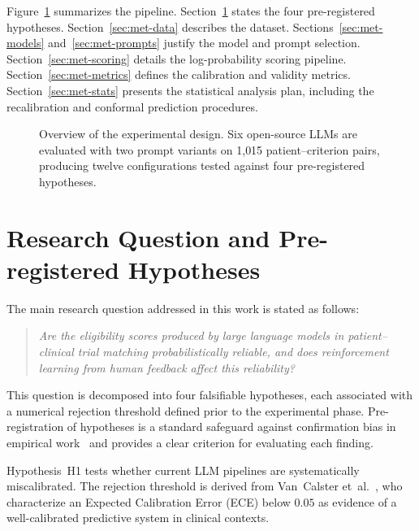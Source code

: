 Figure~\ref{fig:met-overview} summarizes the pipeline. Section~\ref{sec:met-hypotheses} 
states the four pre-registered hypotheses. Section~\ref{sec:met-data} describes 
the dataset. Sections~\ref{sec:met-models} and~\ref{sec:met-prompts} justify 
the model and prompt selection. Section~\ref{sec:met-scoring} details the 
log-probability scoring pipeline. Section~\ref{sec:met-metrics} defines the 
calibration and validity metrics. Section~\ref{sec:met-stats} presents the 
statistical analysis plan, including the recalibration and conformal 
prediction procedures.

\begin{figure}[htbp]
    \centering
    \caption{Overview of the experimental design. Six open-source LLMs are 
        evaluated with two prompt variants on 1{,}015 patient--criterion pairs, 
        producing twelve configurations tested against four pre-registered 
        hypotheses.}
    \label{fig:met-overview}
\end{figure}

\section{Research Question and Pre-registered Hypotheses}
\label{sec:met-hypotheses}

The main research question addressed in this work is stated as follows:

\begin{quote}
    \itshape
    Are the eligibility scores produced by large language models in 
    patient--clinical trial matching probabilistically reliable, and does 
    reinforcement learning from human feedback affect this reliability?
\end{quote}

This question is decomposed into four falsifiable hypotheses, each associated 
with a numerical rejection threshold defined prior to the experimental phase. 
Pre-registration of hypotheses is a standard safeguard against confirmation 
bias in empirical work~\cite{collins2024tripod} and provides a clear criterion 
for evaluating each finding.

Hypothesis~H1 tests whether current LLM pipelines are systematically 
miscalibrated. The rejection threshold is derived from Van~Calster 
et~al.~\cite{vancalster2019calibration}, who characterize an Expected 
Calibration Error (ECE) below $0.05$ as evidence of a well-calibrated 
predictive system in clinical contexts.

